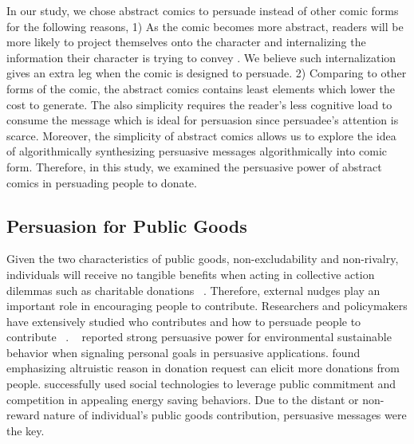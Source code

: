 In our study, we chose abstract comics to persuade instead of other comic forms for the following reasons, 1) As the comic becomes more abstract, readers will be more likely to project themselves onto the character and internalizing the information their character is trying to convey \textcite{scott1993understanding}. We believe such internalization gives an extra leg when the comic is designed to persuade. 2) Comparing to other forms of the comic, the abstract comics contains least elements which lower the cost to generate. The also simplicity requires the reader's less cognitive load to consume the message which is ideal for persuasion since persuadee's attention is scarce. Moreover, the simplicity of abstract comics allows us to explore the idea of algorithmically synthesizing persuasive messages algorithmically into comic form. Therefore, in this study, we examined the persuasive power of abstract comics in persuading people to donate.

\subsection{Persuasion for Public Goods}
Given the two characteristics of public goods, non-excludability and non-rivalry, individuals will receive no tangible benefits when acting in collective action dilemmas such as charitable donations ~\cite{marwell1981economists,isaac1982public}. Therefore, external nudges play an important role in encouraging people to contribute. Researchers and policymakers have extensively studied who contributes and how to persuade people to contribute ~\cite{olson2009logic,becker1974theory,andreoni1990impure,miguel2005ethnic,burnett1981psychographic,pessemier1977willingness,burnett1981psychographic}.  ~\textcite{midden2008using} reported strong persuasive power for environmental sustainable behavior when signaling personal goals in persuasive applications. \textcite{feiler2012mixed} found emphasizing altruistic reason in donation request can elicit more donations from people. \textcite{mankoff2010stepgreen} successfully used social technologies to leverage public commitment and competition in appealing energy saving behaviors.  Due to the distant or non-reward nature of individual's public goods contribution, persuasive messages were the key.

